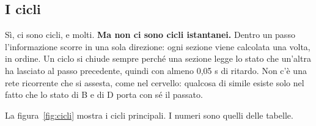 \documentclass[11pt,a4paper]{article}
\begin{document}
\subsection{I cicli}

Sì, ci sono cicli, e molti. \textbf{Ma non ci sono cicli istantanei.} Dentro un passo
l'informazione scorre in una sola direzione: ogni sezione viene calcolata una volta, in
ordine. Un ciclo si chiude sempre perché una sezione legge lo stato che un'altra ha lasciato
al passo precedente, quindi con almeno 0,05 s di ritardo. Non c'è una rete ricorrente che si
assesta, come nel cervello: qualcosa di simile esiste solo nel fatto che lo stato di B e di D
porta con sé il passato.

La figura~\ref{fig:cicli} mostra i cicli principali. I numeri sono quelli delle tabelle.
\end{document}
